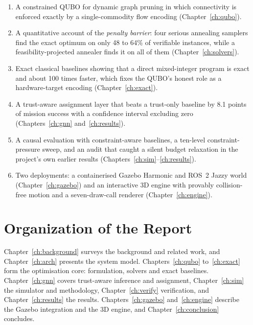\begin{enumerate}[label=\arabic*.]
\item A constrained QUBO for dynamic graph pruning in which connectivity is
enforced exactly by a single-commodity flow encoding (Chapter~\ref{ch:qubo}).
\item A quantitative account of the \emph{penalty barrier}: four serious
annealing samplers find the exact optimum on only 48 to 64\% of verifiable
instances, while a feasibility-projected annealer finds it on all of them
(Chapter~\ref{ch:solvers}).
\item Exact classical baselines showing that a direct mixed-integer program is
exact and about 100 times faster, which fixes the QUBO's honest role as a
hardware-target encoding (Chapter~\ref{ch:exact}).
\item A trust-aware assignment layer that beats a trust-only baseline by 8.1
points of mission success with a confidence interval excluding zero
(Chapters~\ref{ch:gnn} and~\ref{ch:results}).
\item A causal evaluation with constraint-aware baselines, a ten-level
constraint-pressure sweep, and an audit that caught a silent budget
relaxation in the project's own earlier results
(Chapters~\ref{ch:sim}--\ref{ch:results}).
\item Two deployments: a containerised Gazebo Harmonic and ROS~2 Jazzy world
(Chapter~\ref{ch:gazebo}) and an interactive 3D engine with provably
collision-free motion and a seven-draw-call renderer (Chapter~\ref{ch:engine}).
\end{enumerate}

\section{Organization of the Report}

Chapter~\ref{ch:background} surveys the background and related work, and
Chapter~\ref{ch:arch} presents the system model. Chapters~\ref{ch:qubo}
to~\ref{ch:exact} form the optimisation core: formulation, solvers and exact
baselines. Chapter~\ref{ch:gnn} covers trust-aware inference and assignment,
Chapter~\ref{ch:sim} the simulator and methodology, Chapter~\ref{ch:verify}
verification, and Chapter~\ref{ch:results} the results.
Chapters~\ref{ch:gazebo} and~\ref{ch:engine} describe the Gazebo integration
and the 3D engine, and Chapter~\ref{ch:conclusion} concludes.
